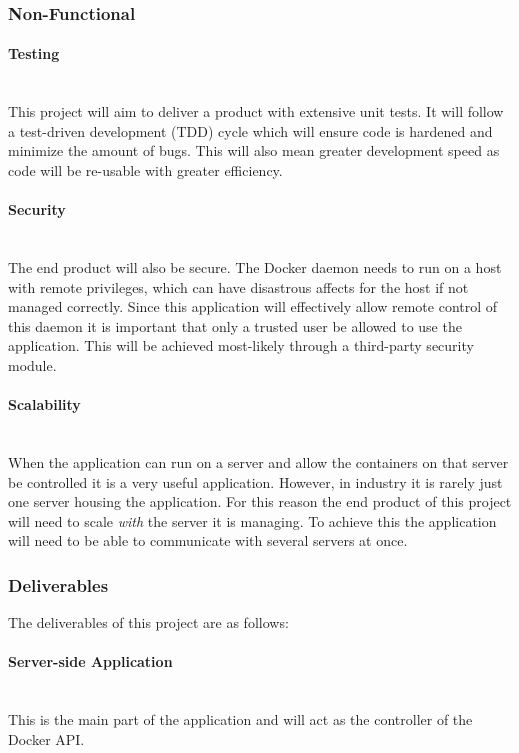 \documentclass{article}
\begin{document}
\subsubsection{Non-Functional}

\paragraph{Testing}\mbox{}\\
This project will aim to deliver a product with extensive unit tests. It will follow a test-driven development (TDD) cycle which will ensure code is hardened and minimize the amount of bugs. This will also mean greater development speed as code will be re-usable with greater efficiency.

\paragraph{Security}\mbox{}\\%
The end product will also be secure. The Docker daemon needs to run on a host with remote privileges, which can have disastrous affects for the host if not managed correctly. Since this application will effectively allow remote control of this daemon it is important that only a trusted user be allowed to use the application. This will be achieved most-likely through a third-party security module. 

\paragraph{Scalability}\mbox{}\\
When the application can run on a server and allow the containers on that server be controlled it is a very useful application. However, in industry it is rarely just one server housing the application. For this reason the end product of this project will need to scale \textit{with} the server it is managing. To achieve this the application will need to be able to communicate with several servers at once.

\subsubsection{Deliverables}
The deliverables of this project are as follows:

\paragraph{Server-side Application}\mbox{}\\
This is the main part of the application and will act as the controller of the Docker API.
\end{document}

